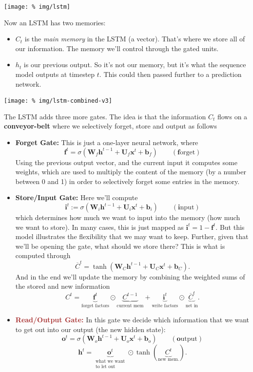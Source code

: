 \documentclass[a2paper,8pt]{extarticle}
\newcommand{\tcr}[1]{\textcolor{lighttext}{#1}}
\newcommand{\tcb}[1]{\textcolor{lighttext}{#1}}
\newcommand{\tcr}[1]{\textcolor{red}{#1}}
\newcommand{\tcb}[1]{\textcolor{blue}{#1}}
\newcommand{\mat}[1]{\mathbf{#1}}
\renewcommand{\vec}[1]{\mathbf{#1}}
\newcommand{\vb}{\vec{b}}
\newcommand{\vf}{\vec{f}}
\newcommand{\vh}{\vec{h}}
\newcommand{\vi}{\vec{i}}
\newcommand{\vo}{\vec{o}}
\newcommand{\vx}{\vec{x}}
\newcommand{\MU}{\mat{U}}
\newcommand{\MW}{\mat{W}}
\begin{document}
\begin{landscape}
\begin{multicols*}{7}
\begin{center}
  \texttt{[image: \%
img/lstm]}
\end{center}

Now an LSTM has two memories:
\begin{itemize}
  \item $C_t$ is the \emph{main memory} in the LSTM (a vector). That's where we
  store all of our information. The memory we'll control through the gated
  units.
  \item $h_t$ is our previous output. So it's not our memory, but it's what the
  sequence model outputs at timestep $t$. This could then passed further to a
  prediction network.
\end{itemize}

\begin{center}
  \texttt{[image: \%
img/lstm-combined-v3]}
\end{center}

The LSTM adds three more gates. The idea is that the information $C_t$ flows on
a \textbf{\tcb{conveyor-belt}} where we selectively forget, store and output as
follows

\begin{itemize}
  \item \textbf{\textcolor{RubineRed}{Forget Gate:}} This is just a one-layer
  neural network, where
  \[
  \vf^t=\sigma(\MW_f\vh^{t-1}+\MU_f\vx^t+\vb_f)
  \qquad(\vf\text{orget})
  \]
  Using the previous output vector, and the current input it computes some
  weights, which are used to multiply the content of the memory (by a number
  between 0 and 1) in order to selectively forget some entries in the memory.
  \item \textbf{\tcr{Store/Input Gate:}} Here we'll compute
  \[
  \vi^t:=\sigma(\MW_i\vh^{t-1}+\MU_i\vx^t+\vb_i)
  \qquad(\vi\text{nput})
  \]
  which determines how much we want to input into the memory (how much we want
  to store). 
  In many cases, this is just mapped as $\vi^t=1-\vf^t$. But this
  model illustrates the flexibility that we may want to keep. Further, given
  that we'll be opening the gate, what should we store there? This is what is
  computed through
  \[
  \overline{C}^t=\tanh(\MW_C\vh^{t-1}+\MU_C\vx^t+\vb_C).
  \]
  And in the end we'll update the memory by combining the weighted sums of
  the stored and new information
  \[
  C^t=\underbrace{\vf^t}_{\text{forget factors}} \odot
  \underbrace{C^{t-1}}_{\text{current mem}} + \underbrace{\vi^t}_{\text{write
  factors}} \odot\underbrace{\overline{C}^t}_{\text{net in}}.
  \]
  \item \textbf{\textcolor{brown}{Read/Output Gate:}} In this gate we decide
  which information that we want to get out into our output (the new hidden
  state):
  \[
  \vo^t=\sigma(\MW_o\vh^{t-1}+\MU_o\vx^t+\vb_o)
  \qquad(\vo\text{utput})
  \]
  \[
  \vh^t=\underbrace{\vo^t}_{\substack{\text{what we want}\\\text{to let
out}}}\odot\tanh(\underbrace{C^t}_{\text{new mem.}}).
  \]
\end{itemize}


\end{multicols*}
\end{landscape}
\end{document}

